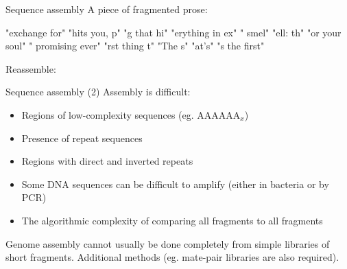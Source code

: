\documentclass[pdf]{beamer}
\begin{document}
\begin{frame}[fragile]{Sequence assembly}
\small
A piece of fragmented prose:

"exchange for" "hits you, p" "g that hi" 
"erything in ex" " smel" "ell: th"  
"or your soul" " promising ever" "rst thing t" "The s"  
"at's" "s the first" 

Reassemble:


\end{frame}

\begin{frame}{Sequence assembly (2)}
  Assembly is difficult:
  \begin{itemize}
    \item Regions of low-complexity sequences (eg. AAAAAA$_x$)
    \item Presence of repeat sequences
    \item Regions with direct and inverted repeats
    \item Some DNA sequences can be difficult to amplify (either in bacteria
      or by PCR)
    \item The algorithmic complexity of comparing all fragments to all
      fragments
  \end{itemize}
  Genome assembly cannot usually be done completely from simple libraries of
  short fragments. Additional methods (eg. mate-pair libraries are also required).
\end{frame}
\end{document}
